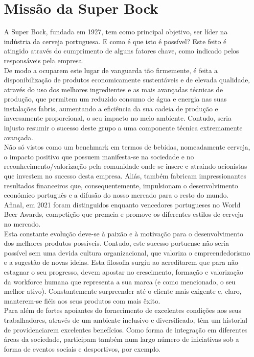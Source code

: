 \section{Missão da Super Bock}

A Super Bock, fundada em 1927, tem como principal objetivo, ser líder na indústria da cerveja portuguesa. E como é que isto é possível? Este feito é atingido através do cumprimento de alguns fatores chave, como indicado pelos responsáveis pela empresa.\\

De modo a ocuparem este lugar de vanguarda tão firmemente, é feita a disponibilização de produtos economicamente sustentáveis e de elevada qualidade, através do uso dos melhores ingredientes e as mais avançadas técnicas de produção, que permitem um reduzido consumo de água e energia nas suas instalações fabris, aumentando a eficiência da sua cadeia de produção e inversamente proporcional, o seu impacto no meio ambiente. Contudo, seria injusto resumir o sucesso deste grupo a uma componente técnica extremamente avançada.\\

Não só vistos como um benchmark em termos de bebidas, nomeadamente cerveja, o impacto positivo que possuem manifesta-se na sociedade e no reconhecimento/valorização pela comunidade onde se insere e atraindo acionistas que investem no sucesso desta empresa. Aliás, também fabricam impressionantes resultados financeiros que, consequentemente, impulsionam o desenvolvimento económico português e a difusão do nosso mercado para o resto do mundo. Afinal, em 2021 foram distinguidos enquanto vencedores portugueses no World Beer Awards, competição que premeia e promove os diferentes estilos de cerveja no mercado.\\ 

Esta constante evolução deve-se à paixão e à motivação para o desenvolvimento dos melhores produtos possíveis. Contudo, este sucesso portuense não seria possível sem uma devida cultura organizacional, que valoriza o empreendedorismo e a sugestão de novas ideias. Esta filosofia surgiu ao acreditarem que para não estagnar o seu progresso, devem apostar no crescimento, formação e valorização da workforce humana que representa a sua marca (e como mencionado, o seu melhor ativo). Constantemente surpreender até o cliente mais exigente e, claro, manterem-se fiéis aos seus produtos com mais êxito.\\
 

Para além de fortes apoiantes do fornecimento de excelentes condições aos seus trabalhadores, através de um ambiente inclusivo e diversificado, têm um historial de providenciarem excelentes benefícios. Como forma de integração em diferentes áreas da sociedade, participam também num largo número de iniciativas sob a forma de eventos sociais e desportivos, por exemplo.\\

